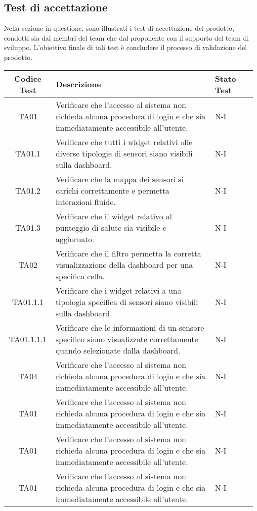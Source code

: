 \subsection{Test di accettazione}
Nella sezione in questione, sono illustrati i test di accettazione del prodotto, condotti sia dai membri del team che dal proponente con il supporto del team di sviluppo. L'obiettivo finale di tali test è concludere il processo di validazione del prodotto.
\\
\begin{longtable}{|c|p{5cm}|p{2cm}|c|}
    \hline
    Codice Test & Descrizione & Stato Test \\
    \hline
    TA01 & Verificare che l'accesso al sistema non richieda alcuna procedura di login e che sia immediatamente accessibile all'utente. & N-I \\
    \hline
    TA01.1 & Verificare che tutti i widget relativi alle diverse tipologie di sensori siano visibili sulla dashboard. & N-I \\
    \hline
    TA01.2 & Verificare che la mappa dei sensori si carichi correttamente e permetta interazioni fluide. & N-I \\
    \hline
    TA01.3 & Verificare che il widget relativo al punteggio di salute sia visibile e aggiornato. & N-I \\
    \hline
    TA02 & Verificare che il filtro permetta la corretta visualizzazione della dashboard per una specifica cella. & N-I \\
    \hline
    TA01.1.1 & Verificare che i widget relativi a una tipologia specifica di sensori siano visibili sulla dashboard. & N-I \\
    \hline
    TA01.1.1.1 & Verificare che le informazioni di un sensore specifico siano visualizzate correttamente quando selezionate dalla dashboard. & N-I \\
    \hline
    TA04 & Verificare che l'accesso al sistema non richieda alcuna procedura di login e che sia immediatamente accessibile all'utente. & N-I \\
    \hline
    TA01 & Verificare che l'accesso al sistema non richieda alcuna procedura di login e che sia immediatamente accessibile all'utente. & N-I \\
    \hline
    TA01 & Verificare che l'accesso al sistema non richieda alcuna procedura di login e che sia immediatamente accessibile all'utente. & N-I \\
    \hline
    TA01 & Verificare che l'accesso al sistema non richieda alcuna procedura di login e che sia immediatamente accessibile all'utente. & N-I \\

\end{longtable}
